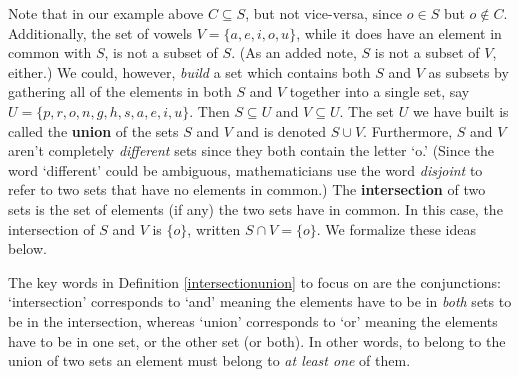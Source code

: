 \medskip


\medskip

Note that in our example above $C \subseteq S$, but not vice-versa, since $o \in S$ but $o \notin C$.  Additionally, the set of vowels $V = \{ a, e, i, o, u\}$, while it does have an element in common with $S$, is not a subset of $S$. (As an added note,  $S$ is not a subset of $V$, either.)  We could, however, \textit{build} a set which contains both $S$ and $V$ as subsets by gathering all of the elements in both $S$ and $V$ together into a single set, say $U = \{ p, r, o, n, g, h, s, a, e, i, u\}$.   Then $S \subseteq U$ and $V \subseteq U$.  The set $U$ we have built is called the \textbf{union} of the sets $S$ and $V$ and is denoted $S \cup V$.    Furthermore, $S$ and $V$ aren't completely \textit{different} sets since they both contain the letter `o.' (Since the word `different' could be ambiguous, mathematicians use the word \textit{disjoint} to refer to two sets that have no elements in common.) The \textbf{intersection} of two sets is the set of elements (if any) the two sets have in common. In this case, the intersection of $S$ and $V$ is $\{ o\}$, written $S \cap V = \{ o \}$.  We formalize these ideas below.

\medskip


\medskip

The key words in Definition \ref{intersectionunion} to focus on are the conjunctions:  `intersection' corresponds to `and' meaning the elements have to be in \textit{both} sets to be in the intersection, whereas `union' corresponds to `or' meaning the elements have to be in one set, or the other set (or both).  In other words, to belong to the union of two sets an element must belong to \textit{at least one} of them.


